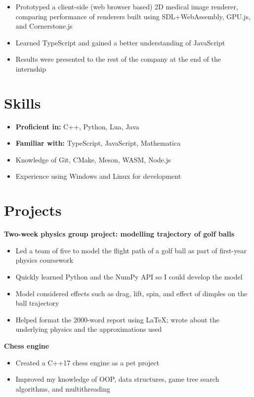 \documentclass{article}
\begin{document}
		\begin{itemize}
			\item Prototyped a client-side (web browser based) 2D medical image renderer, comparing performance of renderers built using SDL+WebAssembly, GPU.js, and Cornerstone.js
			\item Learned TypeScript and gained a better understanding of JavaScript
			\item Results were presented to the rest of the company at the end of the internship
		\end{itemize}
	
	\section*{Skills}
		\begin{itemize}
			\item \textbf{Proficient in:} C++, Python, Lua, Java
			\item \textbf{Familiar with:} TypeScript, JavaScript, Mathematica
			\item Knowledge of Git, CMake, Meson, WASM, Node.js
			\item Experience using Windows and Linux for development
		\end{itemize}
	
	\section*{Projects}
		\textbf{Two-week physics group project: modelling trajectory of golf balls}
		\begin{itemize}
			\item Led a team of five to model the flight path of a golf ball as part of first-year physics coursework
			\item Quickly learned Python and the NumPy API so I could develop the model
			\item Model considered effects such as drag, lift, spin, and effect of dimples on the ball trajectory
			\item Helped format the 2000-word report using LaTeX; wrote about the underlying physics and the approximations used
		\end{itemize}
		\textbf{Chess engine}
		\begin{itemize}
			\item Created a C++17 chess engine as a pet project
			\item Improved my knowledge of OOP, data structures, game tree search algorithms, and multithreading
		\end{itemize}
	
\end{document}

